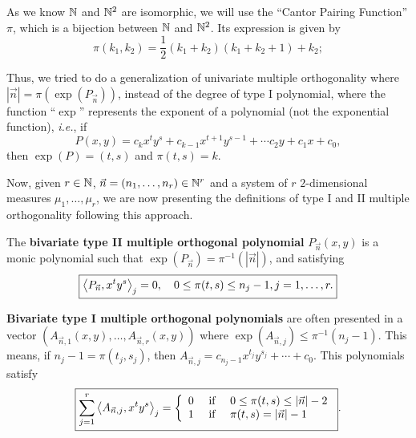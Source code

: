 \documentclass[portrait,final,a0paper,fontscale=0.38]{baposter}
\begin{document}
\begin{poster}
{As we know $\mathbb{N}$ and $\mathbb{N}^2$ are isomorphic, we will use the ``Cantor Pairing Function'' $\pi$, which is a bijection between $\mathbb{N}$ and $\mathbb{N}^2$. Its expression is given by 
$$
\pi(k_1, k_2) = \dfrac{1}{2}(k_1 + k_2)(k_1 + k_2 + 1) + k_2;
$$

Thus, we tried to do a generalization of univariate multiple orthogonality where $|\vec n| = \pi(\exp(P_{\vec n}))$, instead of the degree of type I polynomial, where the function ``$\exp$'' represents the exponent of a polynomial (not the exponential function), \textit{i.e.}, if $$P(x,y)= c_{k} x^t y^s + c_{k-1} x^{t+1} y^{s-1} + \cdots c_2 y + c_1 x + c_0,$$ then $\exp(P)=(t,s)$ and $\pi(t,s)=k$.

Now, given $r\in\mathbb{N}$, $\vec n = (n_1,\dots, n_r)\in\mathbb{N}^r$ and a system of $r$ $2$-dimensional measures $\mu_1, \dots, \mu_r$, we are now presenting the definitions of type I and II multiple orthogonality following this approach. 

\begin{definition}
  The \textbf{bivariate type II multiple orthogonal polynomial} $P_{\vec n}(x,y)$ is a monic polynomial such that $\exp(P_{\vec n})=\pi^{-1}(|\vec n|)$,  and satisfying
  \begin{equation}
    \label{eq:typeII-MOP-2-app}
    \boxed{
    \left\langle P_{\vec n} , x^t y^s \right\rangle_j = 0, \ \ \ 0\leq \pi(t,s)\leq n_j-1, j=1,\dots,r.}
  \end{equation}    
\end{definition}

\begin{definition}
  \textbf{Bivariate type I multiple orthogonal polynomials} are often presented in a vector $(A_{\vec n,1}(x,y),\dots,A_{\vec n,r}(x,y))$ where $\exp(A_{\vec n,j}) \leq \pi^{-1}(n_j-1)$. This means, if $n_j-1 = \pi(t_j,s_j)$, then $A_{\vec n,j} = c_{n_j-1} x^{t_j}y^{s_j}+\cdots + c_0$. This polynomials satisfy
  \begin{equation}
    \label{eq:condition-type-I-2-app}
    \boxed{\sum_{j=1}^r \left\langle A_{\vec n,j} , x^t y^s \right\rangle_j = \left\{\begin{array}{ccl}
        0 &   \text{ if } & 0\leq \pi(t,s)\leq |\vec n|-2 \\
        1 & \text{ if } & \pi(t,s)= |\vec n|-1     
    \end{array}\right.}.
  \end{equation}
\end{definition}

}
\end{poster}
\end{document}
